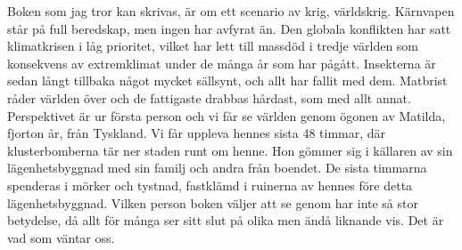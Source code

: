 Boken som jag tror kan skrivas, är om ett scenario av krig, världskrig. Kärnvapen står på full beredskap, men ingen har avfyrat än. Den globala konflikten har satt klimatkrisen i låg prioritet, vilket har lett till massdöd i tredje världen som konsekvens av extremklimat under de många år som har pågått. Insekterna är sedan långt tillbaka något mycket sällsynt, och allt har fallit med dem. Matbrist råder världen över och de fattigaste drabbas hårdast, som med allt annat. Perspektivet är ur första person och vi får se världen genom ögonen av Matilda, fjorton år, från Tyskland. Vi får uppleva hennes sista 48 timmar, där klusterbomberna tär ner staden runt om henne. Hon gömmer sig i källaren av sin lägenhetsbyggnad med sin familj och andra från boendet. De sista timmarna spenderas i mörker och tystnad, fastklämd i ruinerna av hennes före detta lägenhetsbyggnad. Vilken person boken väljer att se genom har inte så stor betydelse, då allt för många ser sitt slut på olika men ändå liknande vis. Det är vad som väntar oss.





















































